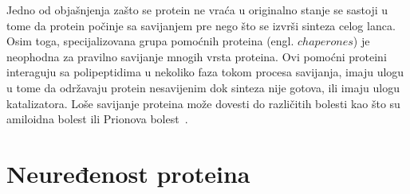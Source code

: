 Jedno od objašnjenja zašto se protein ne vraća u originalno stanje se sastoji u tome da protein počinje sa savijanjem pre nego što se izvrši sinteza celog lanca. Osim toga, specijalizovana grupa pomoćnih proteina (engl. $chaperones$) je neophodna za pravilno savijanje mnogih vrsta proteina. Ovi pomoćni proteini interaguju sa polipeptidima u nekoliko faza tokom procesa savijanja, imaju ulogu u tome da održavaju protein nesavijenim dok sinteza nije gotova, ili imaju ulogu katalizatora. Loše savijanje proteina može dovesti do različitih bolesti kao što su amiloidna bolest ili Prionova bolest~\cite{lippincott}.

\section{Neuređenost proteina}

